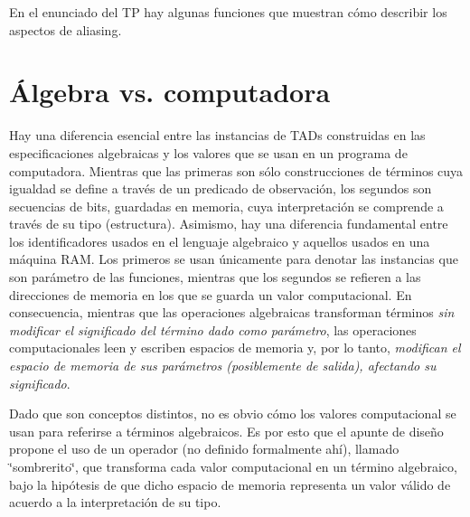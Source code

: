 \-En el enunciado del \-T\-P hay algunas funciones que muestran cómo describir los aspectos de aliasing.\hypertarget{Aliasing_sec-puntero}{}\section{Álgebra vs. computadora}\label{Aliasing_sec-puntero}
\-Hay una diferencia esencial entre las instancias de \-T\-A\-Ds construidas en las especificaciones algebraicas y los valores que se usan en un programa de computadora. \-Mientras que las primeras son sólo construcciones de términos cuya igualdad se define a través de un predicado de observación, los segundos son secuencias de bits, guardadas en memoria, cuya interpretación se comprende a través de su tipo (estructura). \-Asimismo, hay una diferencia fundamental entre los identificadores usados en el lenguaje algebraico y aquellos usados en una máquina \-R\-A\-M. \-Los primeros se usan únicamente para denotar las instancias que son parámetro de las funciones, mientras que los segundos se refieren a las direcciones de memoria en los que se guarda un valor computacional. \-En consecuencia, mientras que las operaciones algebraicas transforman términos {\itshape sin modificar el significado del término dado como parámetro\/}, las operaciones computacionales leen y escriben espacios de memoria y, por lo tanto, {\itshape modifican el espacio de memoria de sus parámetros (posiblemente de salida), afectando su significado\/}.

\-Dado que son conceptos distintos, no es obvio cómo los valores computacional se usan para referirse a términos algebraicos. \-Es por esto que el apunte de diseño propone el uso de un operador (no definido formalmente ahí), llamado \char`\"{}sombrerito\char`\"{}, que transforma cada valor computacional en un término algebraico, bajo la hipótesis de que dicho espacio de memoria representa un valor válido de acuerdo a la interpretación de su tipo.

